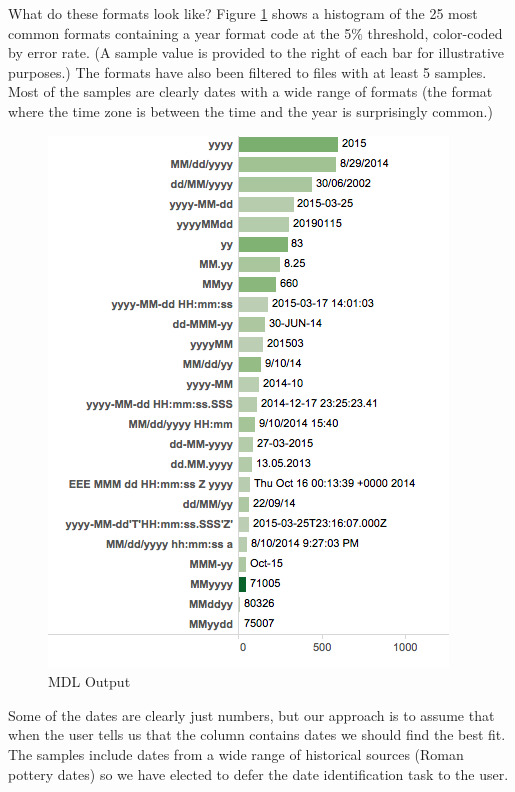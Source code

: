 What do these formats look like? Figure \ref{fig:M3} shows a histogram of the 25 most common formats containing a year format code at the 5\% threshold, color-coded by error rate. (A sample value is provided to the right of each bar for illustrative purposes.) The formats have also been filtered to files with at least 5 samples. Most of the samples are clearly dates with a wide range of formats (the format where the time zone is between the time and the year is surprisingly common.)
 
\begin{figure}[ht]
\centering
\includegraphics[width=\columnwidth]{figures/FigureM3}
\caption{MDL Output}
\label{fig:M3}
\end{figure}


Some of the dates are clearly just numbers, but our approach is to assume that when the user tells us that the column contains dates we should find the best fit. The samples include dates from a wide range of historical sources (\eg Roman pottery dates) so we have elected to defer the date identification task to the user.

